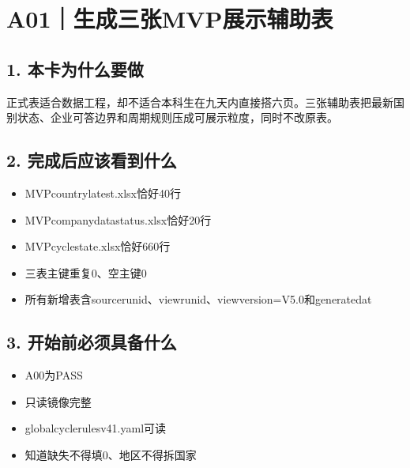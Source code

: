 \documentclass[UTF8,openany,zihao=-4]{ctexbook}
\renewcommand{\_}{\textunderscore\allowbreak}
\begin{document}
\clearpage
\section{A01｜生成三张MVP展示辅助表}
\subsection*{1. 本卡为什么要做}
正式表适合数据工程，却不适合本科生在九天内直接搭六页。三张辅助表把最新国别状态、企业可答边界和周期规则压成可展示粒度，同时不改原表。


\subsection*{2. 完成后应该看到什么}
\begin{itemize}
\item MVP\_country\_latest.xlsx恰好40行
\item MVP\_company\_data\_status.xlsx恰好20行
\item MVP\_cycle\_state.xlsx恰好660行
\item 三表主键重复0、空主键0
\item 所有新增表含source\_run\_id、view\_run\_id、view\_version=V5.0和generated\_at
\end{itemize}

\subsection*{3. 开始前必须具备什么}
\begin{itemize}[label=$\square$]
\item A00为PASS
\item 只读镜像完整
\item global\_cycle\_rules\_v41.yaml可读
\item 知道缺失不得填0、地区不得拆国家
\end{itemize}
\end{document}
